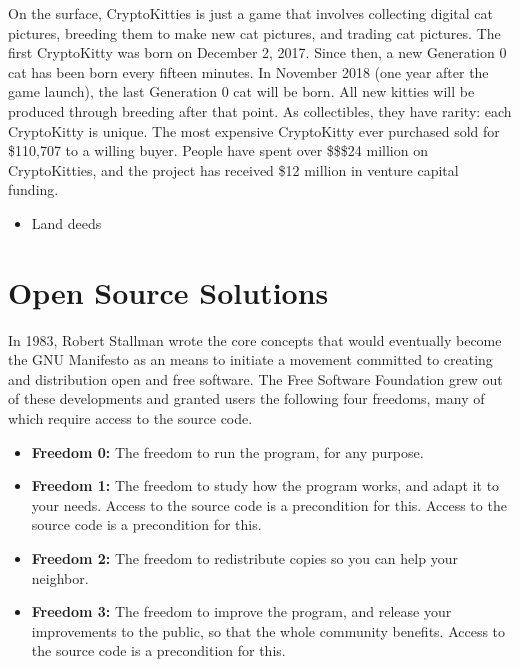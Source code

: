 \documentclass[]{book}
\providecommand{\tightlist}{%
  \setlength{\itemsep}{0pt}\setlength{\parskip}{0pt}}
\begin{document}
On the surface, CryptoKitties is just a game that involves collecting digital cat pictures, breeding them to make new cat pictures, and trading cat pictures. The first CryptoKitty was born on December 2, 2017. Since then, a new Generation 0 cat has been born every fifteen minutes. In November 2018 (one year after the game launch), the last Generation 0 cat will be born. All new kitties will be produced through breeding after that point. As collectibles, they have rarity: each CryptoKitty is unique. The most expensive CryptoKitty ever purchased sold for \$110,707 to a willing buyer. People have spent over \$\$\$24 million on CryptoKitties, and the project has received \$12 million in venture capital funding. \citep{Hoffman2018}

\begin{itemize}
\tightlist
\item
  Land deeds
\end{itemize}

\hypertarget{open-source-solutions}{%
\section{Open Source Solutions}\label{open-source-solutions}}

In 1983, Robert Stallman wrote the core concepts that would eventually become the GNU Manifesto as an means to initiate a movement committed to creating and distribution open and free software. \citep{Stallman1985} The Free Software Foundation grew out of these developments and granted users the following four freedoms, many of which require access to the source code.

\begin{itemize}
\tightlist
\item
  \textbf{Freedom 0:} The freedom to run the program, for any purpose.
\item
  \textbf{Freedom 1:} The freedom to study how the program works, and adapt it to your needs. Access to the source code is a precondition for this. Access to the source code is a precondition for this.
\item
  \textbf{Freedom 2:} The freedom to redistribute copies so you can help your neighbor.
\item
  \textbf{Freedom 3:} The freedom to improve the program, and release your improvements to the public, so that the whole community benefits. Access to the source code is a precondition for this. \citep{FSF2018}
\end{itemize}
\end{document}
